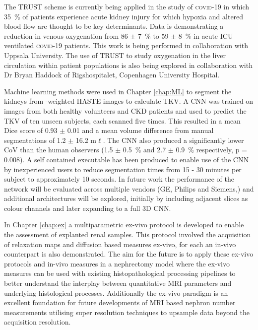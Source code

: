 The \ac{TRUST} scheme is currently being applied in the study of \textsc{covid}-19 in which 35~\% of patients experience acute kidney injury for which hypoxia and altered blood flow are thought to be key determinants. Data is demonstrating a reduction in venous oxygenation from 86 $\pm$ 7~\% to 59 $\pm$ 8~\% in acute \ac{ICU} ventilated \textsc{covid}-19 patients. This work is being performed in collaboration with Uppsala University. The use of \ac{TRUST} to study oxygenation in the liver circulation within patient populations is also being explored in collaboration with Dr Bryan Haddock of Rigshospitalet, Copenhagen University Hospital.

Machine learning methods were used in Chapter \ref{chap:ML} to segment the kidneys from \ttwo-weighted \ac{HASTE} images to calculate \ac{TKV}. A \ac{CNN} was trained on images from both healthy volunteers and \ac{CKD} patients and used to predict the \ac{TKV} of ten unseen subjects, each scanned five times. This resulted in a mean Dice score of 0.93 $\pm$ 0.01 and a mean volume difference from manual segmentations of 1.2 $\pm$ 16.2 m$\ell$. The \ac{CNN} also produced a significantly lower \ac{CoV} than the human observers (1.5 $\pm$ 0.5~\% and 2.7 $\pm$ 0.9~\% respectively, p = 0.008). A self contained executable has been produced to enable use of the \ac{CNN} by inexperienced users to reduce segmentation times from 15 - 30 minutes per subject to approximately 10 seconds. In future work the performance of the network will be evaluated across multiple vendors (GE, Philips and Siemens,) and additional architectures will be explored, initially by including adjacent slices as colour channels and later expanding to a full 3D \ac{CNN}. 

In Chapter \ref{chap:ex} a multiparametric ex-vivo protocol is developed to enable the assessment of explanted renal samples. This protocol involved the acquisition of relaxation maps and diffusion based measures ex-vivo, for each an in-vivo counterpart is also demonstrated. The aim for the future is to apply these ex-vivo protocols and in-vivo measures in a nephrectomy model where the ex-vivo measures can be used with existing histopathological processing pipelines to better understand the interplay between quantitative \ac{MRI} parameters and underlying histological processes. Additionally the ex-vivo paradigm is an excellent foundation for future developments of \ac{MRI} based nephron number measurements utilising super resolution techniques to upsample data beyond the acquisition resolution.

